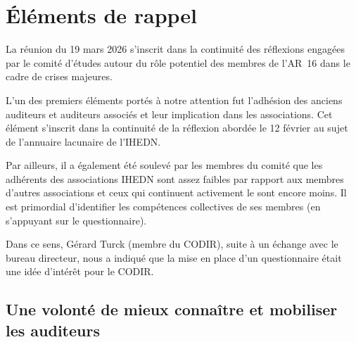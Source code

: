 \documentclass[12pt,a4paper]{article}
\begin{document}

\section{Éléments de rappel}

La réunion du 19 mars 2026 s'inscrit dans la continuité des réflexions engagées
par le comité d'études autour du rôle potentiel des membres de l'AR~16 dans
le cadre de crises majeures.

L'un des premiers éléments portés à notre attention fut l'adhésion des anciens
auditeurs et auditeurs associés et leur implication dans les associations.
Cet élément s'inscrit dans la continuité de la réflexion abordée le 12 février
au sujet de l'annuaire lacunaire de l'IHEDN.

Par ailleurs, il a également été soulevé par les membres du comité que les adhérents
des associations IHEDN sont assez faibles par rapport aux membres d'autres associations
et ceux qui continuent activement le sont encore moins.
Il est primordial d'identifier les compétences collectives de ses membres (en s'appuyant
sur le questionnaire).

Dans ce sens, Gérard Turck (membre du CODIR), suite à un échange avec le bureau directeur,
nous a indiqué que la mise en place d'un questionnaire était une idée d'intérêt
pour le CODIR.

\subsection{Une volonté de mieux connaître et mobiliser les auditeurs}
\end{document}

